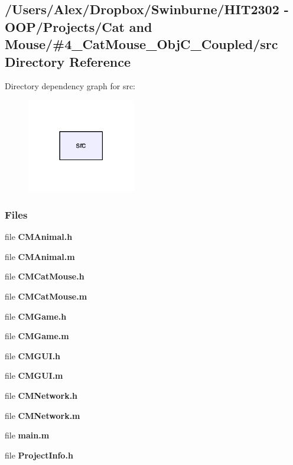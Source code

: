 \subsection{/\-Users/\-Alex/\-Dropbox/\-Swinburne/\-H\-I\-T2302 -\/ O\-O\-P/\-Projects/\-Cat and Mouse/\#4\-\_\-\-Cat\-Mouse\-\_\-\-Obj\-C\-\_\-\-Coupled/src Directory Reference}
\label{dir_68267d1309a1af8e8297ef4c3efbcdba}
Directory dependency graph for src\-:
\nopagebreak
\begin{figure}[H]
\begin{center}
\leavevmode
\includegraphics[width=134pt]{dir_68267d1309a1af8e8297ef4c3efbcdba_dep}
\end{center}
\end{figure}
\subsubsection*{Files}
\begin{DoxyCompactItemize}
\item 
file {\bf C\-M\-Animal.\-h}
\item 
file {\bf C\-M\-Animal.\-m}
\item 
file {\bf C\-M\-Cat\-Mouse.\-h}
\item 
file {\bf C\-M\-Cat\-Mouse.\-m}
\item 
file {\bf C\-M\-Game.\-h}
\item 
file {\bf C\-M\-Game.\-m}
\item 
file {\bf C\-M\-G\-U\-I.\-h}
\item 
file {\bf C\-M\-G\-U\-I.\-m}
\item 
file {\bf C\-M\-Network.\-h}
\item 
file {\bf C\-M\-Network.\-m}
\item 
file {\bf main.\-m}
\item 
file {\bf Project\-Info.\-h}
\end{DoxyCompactItemize}
